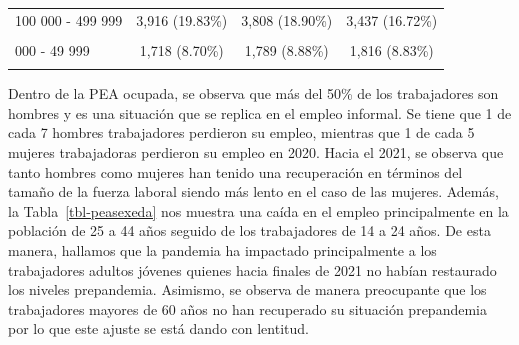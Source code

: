 \documentclass[
  letterpaper,
  12pt,
  oneside,
  spanish,
  doublespacing,
  headsepline,
  parskip]{MastersDoctoralThesis}
\begin{document}
\begin{table}[H]
\begin{tabular}{lccc}
100 000 - 499 999 & 3,916 (19.83\%) & 3,808 (18.90\%) & 3,437 (16.72\%)\\
\cellcolor{gray!6}{50 000 - 99 999} & \cellcolor{gray!6}{1,131 (5.73\%)} & \cellcolor{gray!6}{1,071 (5.32\%)} & \cellcolor{gray!6}{1,152 (5.60\%)}\\
\addlinespace
20 000 - 49 999 & 1,718 (8.70\%) & 1,789 (8.88\%) & 1,816 (8.83\%)\\
\cellcolor{gray!6}{2 000 - 19 999} & \cellcolor{gray!6}{3,264 (16.53\%)} & \cellcolor{gray!6}{3,559 (17.66\%)} & \cellcolor{gray!6}{3,895 (18.94\%)}\\
\bottomrule
\end{tabular}
\endgroup{}
\end{table}

Dentro de la PEA ocupada, se observa que más del 50\% de los
trabajadores son hombres y es una situación que se replica en el empleo
informal. Se tiene que 1 de cada 7 hombres trabajadores perdieron su
empleo, mientras que 1 de cada 5 mujeres trabajadoras perdieron su
empleo en 2020. Hacia el 2021, se observa que tanto hombres como mujeres
han tenido una recuperación en términos del tamaño de la fuerza laboral
siendo más lento en el caso de las mujeres. Además, la
Tabla~\ref{tbl-peasexeda} nos muestra una caída en el empleo
principalmente en la población de 25 a 44 años seguido de los
trabajadores de 14 a 24 años. De esta manera, hallamos que la pandemia
ha impactado principalmente a los trabajadores adultos jóvenes quienes
hacia finales de 2021 no habían restaurado los niveles prepandemia.
Asimismo, se observa de manera preocupante que los trabajadores mayores
de 60 años no han recuperado su situación prepandemia por lo que este
ajuste se está dando con lentitud.
\end{document}
